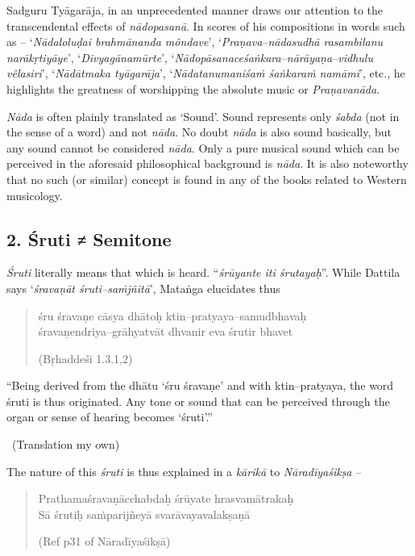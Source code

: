 Sadguru Tyāgarāja, in an unprecedented manner draws our attention to the transcendental effects of \textit{nādopasanā}. In scores of his compositions in words such as – ‘\textit{Nādaloluḍai brahmānanda môndave}’, ‘\textit{Praṇava–nādasudhā rasambilanu narākṛtiyāye}’, ‘\textit{Divyagānamūrte}’, ‘\textit{Nādopāsanace\break śaṅkara–nārāyaṇa–vidhulu vêlasiri}’, ‘\textit{Nādātmaka tyāgarāja}’, ‘\textit{Nādatanum\break aniśaṁ śaṅkaraṁ namāmi}’, etc., he highlights the greatness of worshipping the absolute music or \textit{Praṇavanāda}.

\textit{Nāda} is often plainly translated as ‘Sound’. Sound represents only \textit{śabda} (not in the sense of a word) and not \textit{nāda}. No doubt \textit{nāda} is also sound basically, but any sound cannot be considered \textit{nāda}. Only a pure musical sound which can be perceived in the aforesaid philosophical background is \textit{nāda}. It is also noteworthy that no such (or similar) concept is found in any of the books related to Western musicology.


\subsection*{2. Śruti ≠ Semitone}

\textit{Śruti} literally means that which is heard. “\textit{śrūyante iti śrutayaḥ}”. While Dattila says ‘\textit{śravaṇāt śruti–saṁjñitā}’, Mataṅga elucidates thus

\begin{verse}
śru śravaṇe cāsya dhātoḥ ktin–pratyaya–samudbhavaḥ \\ śravaṇendriya–grāhyatvāt dhvanir eva śrutir bhavet  
\begin{flushright}
(Bṛhaddeśī 1.3.1,2)
\end{flushright}
\end{verse}

\begin{myquote}
“Being derived from the dhātu ‘śru śravaṇe’ and with ktin–pratyaya, the word śruti is thus originated. Any tone or sound that can be perceived through the organ or sense of hearing becomes ‘śruti’.” 

~\hfill (Translation my own)
\end{myquote}

The nature of this \textit{śruti} is thus explained in a \textit{kārikā} to \textit{Nāradīyaśikṣa} –

\begin{verse}
Prathamaśravaṇācchabdaḥ śrūyate hrasvamātrakaḥ \\ Sā śrutiḥ saṁparijñeyā svarāvayavalakṣaṇā  
\begin{flushright}
(Ref p31 of Nāradīyaśikṣā)
\end{flushright}
\end{verse}

